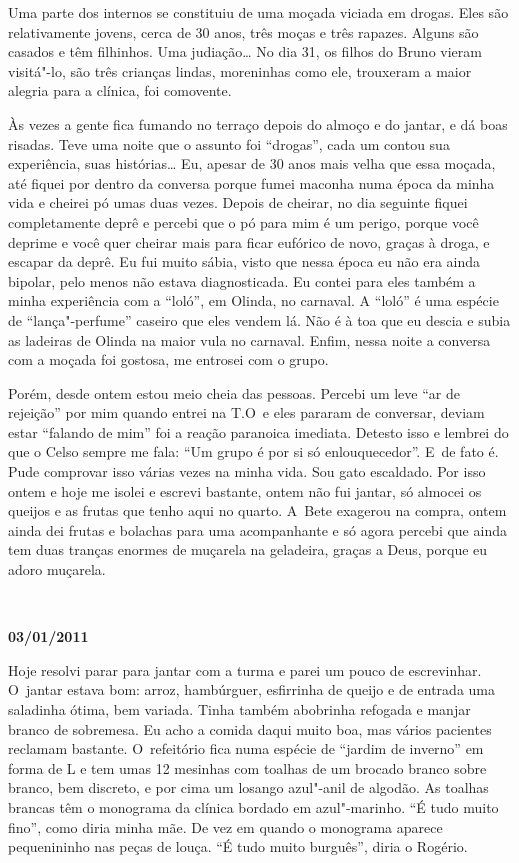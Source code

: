 Uma parte dos internos se constituiu de uma moçada viciada em drogas.
Eles são relativamente jovens, cerca de 30 anos, três moças e três
rapazes. Alguns são casados e têm filhinhos. Uma judiação… No dia
31, os filhos do Bruno vieram visitá"-lo, são três crianças lindas,
moreninhas como ele, trouxeram a maior alegria para a clínica, foi
comovente.

Às vezes a gente fica fumando no terraço depois do almoço e do jantar, e
dá boas risadas. Teve uma noite que o assunto foi ``drogas'', cada um
contou sua experiência, suas histórias… Eu, apesar de 30 anos
mais velha que essa moçada, até fiquei por dentro da conversa porque
fumei maconha numa época da minha vida e cheirei pó umas duas vezes.
Depois de cheirar, no dia seguinte fiquei completamente deprê e percebi
que o pó para mim é um perigo, porque você deprime e você quer cheirar
mais para ficar eufórico de novo, graças à droga, e escapar da deprê. Eu
fui muito sábia, visto que nessa época eu não era ainda bipolar, pelo
menos não estava diagnosticada. Eu contei para eles também a minha
experiência com a ``loló'', em Olinda, no carnaval. A ``loló'' é uma
espécie de ``lança"-perfume'' caseiro que eles vendem lá. Não é à toa que
eu descia e subia as ladeiras de Olinda na maior vula no carnaval.
Enfim, nessa noite a conversa com a moçada foi gostosa, me entrosei com
o grupo.

Porém, desde ontem estou meio cheia das pessoas. Percebi um leve ``ar de
rejeição'' por mim quando entrei na T.O\, e eles pararam de conversar,
deviam estar ``falando de mim'' foi a reação paranoica imediata. Detesto
isso e lembrei do que o Celso sempre me fala: ``Um grupo é por si só
enlouquecedor''. E~de fato é. Pude comprovar isso várias vezes na minha
vida. Sou gato escaldado. Por isso ontem e hoje me isolei e escrevi
bastante, ontem não fui jantar, só almocei os queijos e as frutas que
tenho aqui no quarto. A~Bete exagerou na compra, ontem ainda dei frutas
e bolachas para uma acompanhante e só agora percebi que ainda tem duas
tranças enormes de muçarela na geladeira, graças a Deus, porque eu adoro
muçarela.

\begin{center}\asterisc{}​\end{center}

\begin{flushright}\textbf{03/01/2011}\end{flushright}


Hoje resolvi parar para jantar com a turma e parei um pouco de
escrevinhar. O~jantar estava bom: arroz, hambúrguer, esfirrinha de
queijo e de entrada uma saladinha ótima, bem variada. Tinha também
abobrinha refogada e manjar branco de sobremesa. Eu acho a comida daqui
muito boa, mas vários pacientes reclamam bastante. O~refeitório fica
numa espécie de ``jardim de inverno'' em forma de L e tem umas 12
mesinhas com toalhas de um brocado branco sobre branco, bem discreto, e
por cima um losango azul"-anil de algodão. As toalhas brancas têm o
monograma da clínica bordado em azul"-marinho. ``É tudo muito fino'',
como diria minha mãe. De vez em quando o monograma aparece pequenininho
nas peças de louça. ``É tudo muito burguês'', diria o Rogério.

